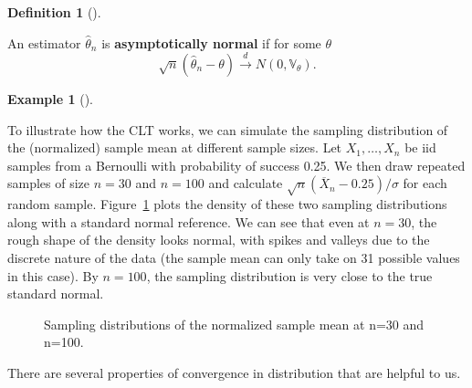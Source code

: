 \documentclass[
  13pt,
  letterpaper,
  DIV=11,
  numbers=noendperiod]{scrreprt}
\newcommand{\V}{\mathbb{V}}
\newcommand{\Xbar}{\overline{X}}
\newcommand{\indist}{\overset{d}{\to}}
\theoremstyle{plain}
\theoremstyle{definition}
\newtheorem{example}{Example}[chapter]
\theoremstyle{definition}
\newtheorem{definition}{Definition}[chapter]
\theoremstyle{remark}
\begin{document}
\begin{definition}[]\protect\hypertarget{def-asymptotically-normal}{}\label{def-asymptotically-normal}

An estimator \(\widehat{\theta}_n\) is \textbf{asymptotically normal} if
for some \(\theta\) \[
\sqrt{n}\left( \widehat{\theta}_n - \theta \right) \indist N\left(0,\V_{\theta}\right).
\]

\end{definition}

\begin{example}[]\protect\hypertarget{exm-bin-clt}{}\label{exm-bin-clt}

To illustrate how the CLT works, we can simulate the sampling
distribution of the (normalized) sample mean at different sample sizes.
Let \(X_1, \ldots, X_n\) be iid samples from a Bernoulli with
probability of success 0.25. We then draw repeated samples of size
\(n=30\) and \(n=100\) and calculate \(\sqrt{n}(\Xbar_n - 0.25)/\sigma\)
for each random sample. Figure~\ref{fig-clt} plots the density of these
two sampling distributions along with a standard normal reference. We
can see that even at \(n=30\), the rough shape of the density looks
normal, with spikes and valleys due to the discrete nature of the data
(the sample mean can only take on 31 possible values in this case). By
\(n=100\), the sampling distribution is very close to the true standard
normal.

\begin{figure}[th]


\caption{\label{fig-clt}Sampling distributions of the normalized sample
mean at n=30 and n=100.}

\end{figure}%

\end{example}

There are several properties of convergence in distribution that are
helpful to us.
\end{document}
